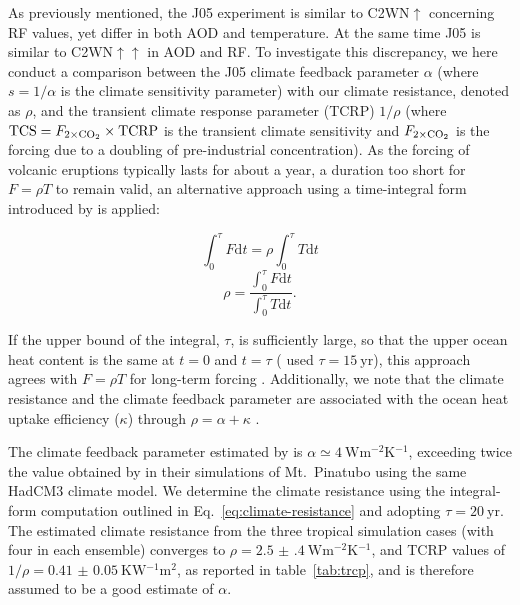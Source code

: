 \documentclass[draft]{agujournal2019}
\newcommand{\cws}{C2WN\(\uparrow\)}
\newcommand{\cwss}{C2WN\(\uparrow\uparrow\)}
\begin{document}
As previously mentioned, the J05 experiment is similar to \cws{} concerning RF values,
yet differ in both AOD and temperature. At the same time J05 is similar to \cwss{} in
AOD and RF. To investigate this discrepancy, we here conduct a comparison between the
J05 climate feedback parameter \(\alpha\) (where \(s=1/\alpha\) is the climate
sensitivity parameter) with our climate resistance, denoted as \(\rho\), and the
transient climate response parameter (TCRP) \(1/\rho\) (where
\(\mathrm{TCS}=F_{2\times\ce{CO2}}\times \mathrm{TCRP}\) is the transient climate
sensitivity and \(F_{2\times\ce{CO2}}\) is the forcing due to a doubling of
pre-industrial  concentration). As the forcing of volcanic eruptions typically
lasts for about a year, a duration too short for \(F=\rho T\) to remain valid, an
alternative approach using a time-integral form introduced by  is
applied:

\begin{equation}
  \int_0^{\tau}F \mathrm{d}t=\rho\int_{0}^{\tau}T \mathrm{d}t
  \label{eq:climate-resistance-orig}
\end{equation}
\begin{equation}
  \rho=\frac{\int_0^{\tau}F \mathrm{d}t}{\int_{0}^{\tau}T \mathrm{d}t}.
  \label{eq:climate-resistance}
\end{equation}

If the upper bound of the integral, \(\tau\), is sufficiently large, so that the upper
ocean heat content is the same at \(t=0\) and \(t=\tau\) ( used \(\tau
=\SI{15}{\mathrm{yr}}\)), this approach agrees with \(F=\rho T\) for long-term forcing
\cite{gregory2016}. Additionally, we note that the climate resistance and the climate
feedback parameter are associated with the ocean heat uptake efficiency (\(\kappa\))
through \(\rho =\alpha +\kappa\) \cite{gregory2016}.

The climate feedback parameter estimated by  is \(\alpha \simeq
\SI{4}{\watt\metre^{-2}\kelvin^{-1}}\), exceeding twice the value obtained by
 in their simulations of Mt.\ Pinatubo using the same HadCM3 climate
model. We determine the climate resistance using the integral-form computation outlined
in Eq.~\ref{eq:climate-resistance} and adopting \(\tau =\SI{20}{\mathrm{yr}}\). The
estimated climate resistance from the three tropical simulation cases (with four in each
ensemble) converges to \(\rho =\SI{2.5(4)}{\watt\metre^{-2}\kelvin^{-1}}\), and TCRP
values of \(1/\rho=\SI{0.41(5)}{\kelvin\watt^{-1}\metre^{2}}\), as reported in
table~\ref{tab:trcp}, and is therefore assumed to be a good estimate of \(\alpha\).
\end{document}
